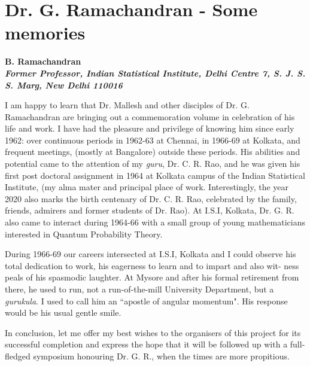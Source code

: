 \chapter{Dr. G. Ramachandran - Some memories}\label{chap24}


\begin{center}
\textbf{B. Ramachandran}\\
\textbf{\textit{Former Professor, Indian Statistical Institute, Delhi Centre 7, S. J. S. S. Marg, New Delhi 110016}}
\end{center}

I am happy to learn that Dr. Mallesh and other disciples of Dr. G. Ramachandran are bringing out a commemoration volume in celebration of his life
and work. I have had the pleasure and privilege of knowing him since early
1962: over continuous periods in 1962-63 at Chennai, in 1966-69 at Kolkata,
and frequent meetings, (mostly at Bangalore) outside these periods. His abilities and potential came to the attention of my \textit{guru}, Dr. C. R. Rao, and he was
given his first post doctoral assignment in 1964 at Kolkata campus of the Indian
Statistical Institute, (my alma mater and principal place of work. Interestingly,
the year 2020 also marks the birth centenary of Dr. C. R. Rao, celebrated by
the family, friends, admirers and former students of Dr. Rao). At I.S.I, Kolkata,
Dr. G. R. also came to interact during 1964-66 with a small group of young
mathematicians interested in Quantum Probability Theory.

During 1966-69 our careers intersected at I.S.I, Kolkata and I could observe
his total dedication to work, his eagerness to learn and to impart and also wit-
ness peals of his spasmodic laughter. At Mysore and after his formal retirement
from there, he used to run, not a run-of-the-mill University Department, but a
\textit{gurukula}. I used to call him an ``apostle of angular momentum". His response
would be his usual gentle smile.

\eject

In conclusion, let me offer my best wishes to the organisers of this project
for its successful completion and express the hope that it will be followed up
with a full-fledged symposium honouring Dr. G. R., when the times are more
propitious.

\vspace{.5cm}

